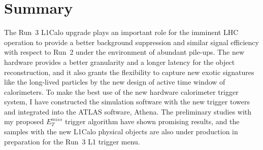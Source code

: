 \section{Summary}
The Run~3 L1Calo upgrade plays an important role for the imminent LHC operation to provide a better background suppression and similar signal efficiency with respect to Run~2 under the environment of abundant pile-ups. The new hardware provides a better granularity and a longer latency for the object reconstruction, and it also grants the flexibility to capture new exotic signatures like the long-lived particles by the new design of active time window of calorimeters. To make the best use of the new hardware calorimeter trigger system, I have constructed the simulation software with the new trigger towers and integrated into the ATLAS software, Athena. The preliminary studies with my proposed $E^{miss}_{T}$ trigger algorithm have shown promising results, and the samples with the new L1Calo physical objects are also under production in preparation for the Run~3 L1 trigger menu. 